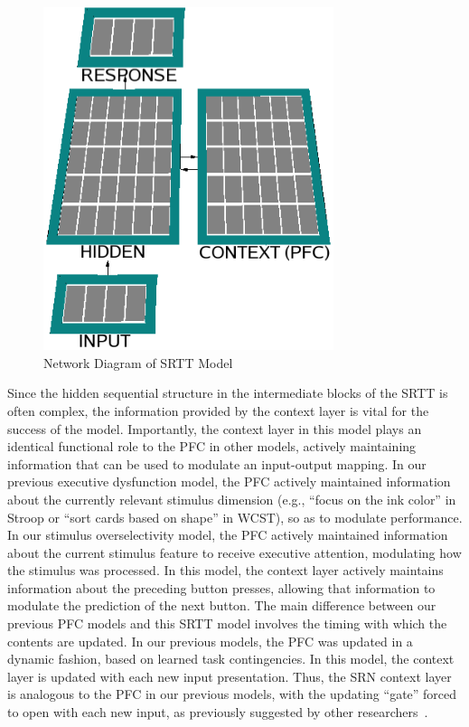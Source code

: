 \documentclass[man]{apa}
\begin{document}
\begin{figure}[t]
\begin{center}
	\includegraphics[width=85mm]{figures/srtt_network.eps}
\end{center}
\caption{Network Diagram of SRTT Model} 
\label{network-diagram-srtt}
\end{figure}

Since the hidden sequential structure in the intermediate blocks of the SRTT is often complex, the information provided by the context layer is vital for the success of the model.  Importantly, the context layer in this model plays an identical functional role to the PFC in other models, actively maintaining information that can be used to modulate an input-output mapping.  In our previous executive dysfunction model, the PFC actively maintained information about the currently relevant stimulus dimension (e.g., ``focus on the ink color'' in Stroop or ``sort cards based on shape'' in WCST), so as to modulate performance.  In our stimulus overselectivity model, the PFC actively maintained information about the current stimulus feature to receive executive attention, modulating how the stimulus was processed.  In this model, the context layer actively maintains information about the preceding button presses, allowing that information to modulate the prediction of the next button.  The main difference between our previous PFC models and this SRTT model involves the timing with which the contents are updated.  In our previous models, the PFC was updated in a dynamic fashion, based on learned task contingencies.  In this model, the context layer is updated with each new input presentation.  Thus, the SRN context layer is analogous to the PFC in our previous models, with the updating ``gate'' forced to open with each new input, as previously suggested by other researchers~\cite{OReillyRC:2006:MWMW}.
\end{document}
